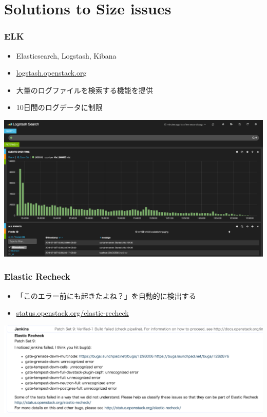 \documentclass[aspectratio=169,11pt,hyperref={colorlinks=true}]{beamer}
\begin{document}
\section{Solutions to Size issues}
\begin{frame}
  \frametitle{ELK}
  \begin{itemize}
    \item Elasticsearch, Logstash, Kibana
    \item \href{http://logstash.openstack.org}{logstash.openstack.org}
    \item 大量のログファイルを検索する機能を提供
    \item 10日間のログデータに制限
  \end{itemize}
  \begin{center}
    \includegraphics[width=.75\textwidth]{kibana-sample.png}
  \end{center}
\end{frame}

\begin{frame}
  \frametitle{Elastic Recheck}
  \begin{itemize}
    \item 「このエラー前にも起きたよね？」を自動的に検出する
    \item \href{http://status.openstack.org/elastic-recheck/}{status.openstack.org/elastic-recheck}
  \end{itemize}
  \begin{center}
    \includegraphics[width=.9\textwidth]{elastic-recheck-sample.png}
  \end{center}
\end{frame}
\end{document}
